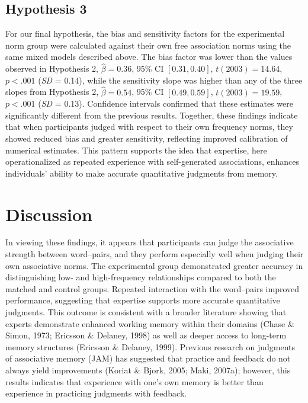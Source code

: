 \documentclass[
  man,floatsintext]{apa7}
\begin{document}
\subsection{Hypothesis 3}\label{hypothesis-3}

For our final hypothesis, the bias and sensitivity factors for the
experimental norm group were calculated against their own free
association norms using the same mixed models described above. The bias
factor was lower than the values observed in Hypothesis 2,
\(\hat{\beta} = 0.36\), 95\% CI \([0.31, 0.40]\), \(t(2003) = 14.64\), \(p < .001\) (\emph{SD} = 0.14), while the
sensitivity slope was higher than any of the three slopes from
Hypothesis 2, \(\hat{\beta} = 0.54\), 95\% CI \([0.49, 0.59]\), \(t(2003) = 19.59\), \(p < .001\) (\emph{SD} = 0.13).
Confidence intervals confirmed that these estimates were significantly
different from the previous results. Together, these findings indicate
that when participants judged with respect to their own frequency norms,
they showed reduced bias and greater sensitivity, reflecting improved
calibration of numerical estimates. This pattern supports the idea that
expertise, here operationalized as repeated experience with
self-generated associations, enhances individuals' ability to make
accurate quantitative judgments from memory.

\section{Discussion}\label{discussion}

In viewing these findings, it appears that participants can judge the
associative strength between word--pairs, and they perform especially
well when judging their own associative norms. The experimental group
demonstrated greater accuracy in distinguishing low- and high-frequency
relationships compared to both the matched and control groups. Repeated
interaction with the word--pairs improved performance, suggesting that
expertise supports more accurate quantitative judgments. This outcome is
consistent with a broader literature showing that experts demonstrate
enhanced working memory within their domains (Chase \& Simon, 1973; Ericsson \& Delaney, 1998)
as well as deeper access to long-term memory structures (Ericsson \& Delaney, 1999).
Previous research on judgments of associative memory (JAM) has suggested
that practice and feedback do not always yield improvements (Koriat \& Bjork, 2005; Maki, 2007a); however, this results indicates that experience with one's
own memory is better than experience in practicing judgments with
feedback.
\end{document}
